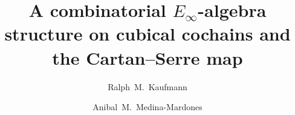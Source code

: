 \documentclass{amsart}
\title[A combinatorial $E_\infty$-algebra structure on cubical cochains]{A combinatorial $E_\infty$-algebra structure on cubical cochains and the Cartan--Serre map}
\author[R.~Kaufmann]{Ralph~M.~Kaufmann}
\author{Anibal~M.~Medina-Mardones}
\begin{document}
	
	\maketitle
	
	
	
	
	
	
	\sloppy
	\printbibliography
\end{document}
